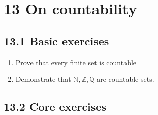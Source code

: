 \documentclass[10pt,\jkfside,a4paper]{article}
\begin{document}
\section*{13 On countability}

\subsection*{13.1 Basic exercises}

\begin{enumerate}

\item Prove that every finite set is countable



\item Demonstrate that $\mathbb{N}, \mathbb{Z}, \mathbb{Q}$ are countable sets.



\end{enumerate}

\subsection*{13.2 Core exercises}
\end{document}

